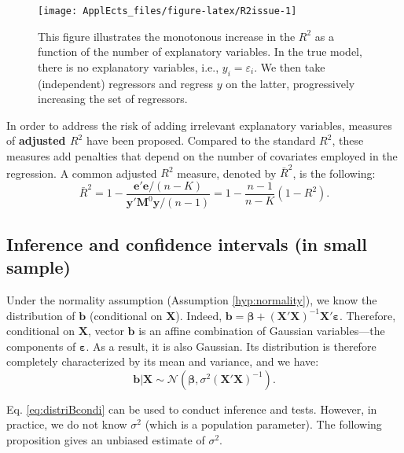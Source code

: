 \documentclass[
  12pt,
]{book}
\theoremstyle{definition}
\theoremstyle{definition}
\theoremstyle{definition}
\theoremstyle{definition}
\theoremstyle{remark}
\begin{document}
\begin{figure}
\texttt{[image: ApplEcts\_files/figure-latex/R2issue-1]} \caption{This figure illustrates the monotonous increase in the $R^2$ as a function of the number of explanatory variables. In the true model, there is no explanatory variables, i.e., $y_i = \varepsilon_i$. We then take (independent) regressors and regress $y$ on the latter, progressively increasing the set of regressors.}\label{fig:R2issue}
\end{figure}

In order to address the risk of adding irrelevant explanatory variables, measures of \textbf{adjusted \(R^2\)} have been proposed. Compared to the standard \(R^2\), these measures add penalties that depend on the number of covariates employed in the regression. A common adjusted \(R^2\) measure, denoted by \(\bar{R}^2\), is the following:
\begin{equation*}
\boxed{\bar{R}^2 = 1 - \frac{\mathbf{e}'\mathbf{e}/(n-K)}{\mathbf{y}'\mathbf{M}^0\mathbf{y}/(n-1)} = 1 - \frac{n-1}{n-K}(1-R^2).}
\end{equation*}

\hypertarget{inference-and-confidence-intervals-in-small-sample}{%
\subsection{Inference and confidence intervals (in small sample)}\label{inference-and-confidence-intervals-in-small-sample}}

Under the normality assumption (Assumption \ref{hyp:normality}), we know the distribution of \(\mathbf{b}\) (conditional on \(\mathbf{X}\)). Indeed, \(\mathbf{b} = \boldsymbol\beta + (\mathbf{X}'\mathbf{X})^{-1} \mathbf{X}'\boldsymbol\varepsilon\). Therefore, conditional on \(\mathbf{X}\), vector \(\mathbf{b}\) is an affine combination of Gaussian variables---the components of \(\boldsymbol\varepsilon\). As a result, it is also Gaussian. Its distribution is therefore completely characterized by its mean and variance, and we have:
\begin{equation}
\mathbf{b}|\mathbf{X} \sim \mathcal{N}(\boldsymbol\beta,\sigma^2(\mathbf{X}'\mathbf{X})^{-1}).\label{eq:distriBcondi}
\end{equation}

Eq. \eqref{eq:distriBcondi} can be used to conduct inference and tests. However, in practice, we do not know \(\sigma^2\) (which is a population parameter). The following proposition gives an unbiased estimate of \(\sigma^2\).
\end{document}
